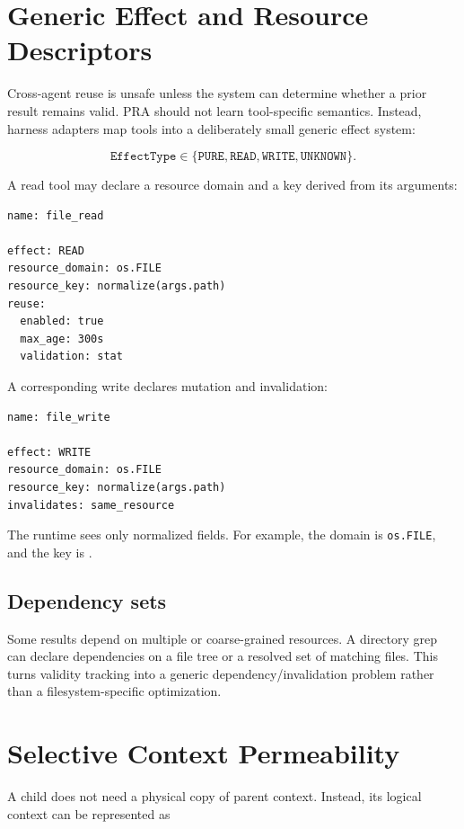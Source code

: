 \documentclass[11pt]{article}
\begin{document}
\section{Generic Effect and Resource Descriptors}

Cross-agent reuse is unsafe unless the system can determine whether a prior result remains valid. PRA should not learn tool-specific semantics. Instead, harness adapters map tools into a deliberately small generic effect system:

\[
\texttt{EffectType} \in \{\texttt{PURE},\texttt{READ},\texttt{WRITE},\texttt{UNKNOWN}\}.
\]

A read tool may declare a resource domain and a key derived from its arguments:

\begin{lstlisting}[basicstyle=\ttfamily\small]
name: file_read

effect: READ
resource_domain: os.FILE
resource_key: normalize(args.path)
reuse:
  enabled: true
  max_age: 300s
  validation: stat
\end{lstlisting}

A corresponding write declares mutation and invalidation:

\begin{lstlisting}[basicstyle=\ttfamily\small]
name: file_write

effect: WRITE
resource_domain: os.FILE
resource_key: normalize(args.path)
invalidates: same_resource
\end{lstlisting}

The runtime sees only normalized fields. For example, the domain is
\texttt{os.FILE}, and the key is .

\subsection{Dependency sets}

Some results depend on multiple or coarse-grained resources. A directory grep can declare dependencies on a file tree or a resolved set of matching files. This turns validity tracking into a generic dependency/invalidation problem rather than a filesystem-specific optimization.

\section{Selective Context Permeability}

A child does not need a physical copy of parent context. Instead, its logical context can be represented as
\end{document}

